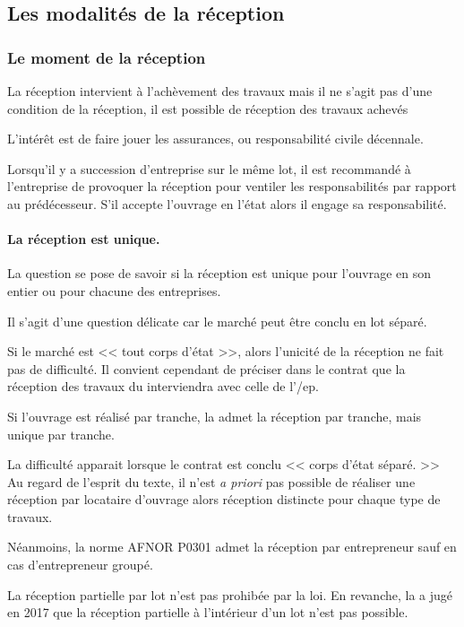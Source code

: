 	\subsection{Les modalités de la réception}

		\subsubsection{Le moment de la réception}

			La réception intervient à l’achèvement des travaux mais il ne s’agit pas d’une condition de la réception, il est possible de réception des travaux achevés 


			L’intérêt est de faire jouer les assurances, \do ou responsabilité civile décennale.


			Lorsqu’il y a succession d’entreprise sur le même lot, il est recommandé à l’entreprise de provoquer la réception pour ventiler les responsabilités par rapport au prédécesseur. S’il accepte l’ouvrage en l’état alors il engage sa responsabilité.


			\paragraph{La réception est unique.}

			La question se pose de savoir si la réception est unique pour l’ouvrage en son entier ou pour chacune des entreprises.


			Il s'agit d'une question délicate car le marché peut être conclu en lot séparé.


			Si le marché est << tout corps d’état >>, alors l'unicité de la réception ne fait pas de difficulté. Il convient cependant de préciser dans le contrat \ST* que la réception des travaux du \ST interviendra avec celle de l'/ep.


			\medbreak Si l’ouvrage est réalisé par tranche, la \JP admet la réception par tranche, mais unique par tranche.


			La difficulté apparait lorsque le contrat est conclu << corps d’état séparé. >> Au regard de l’esprit du texte, il n'est \emph{a priori} pas possible de réaliser une réception par locataire d’ouvrage alors réception distincte pour chaque type de travaux.


			Néanmoins, la norme AFNOR P0301 admet la réception par entrepreneur sauf en cas d’entrepreneur groupé.


			La réception partielle par lot n’est pas prohibée par la loi. En revanche, la \civTrois a jugé en 2017 que la réception partielle à l’intérieur d’un lot n’est pas possible.


